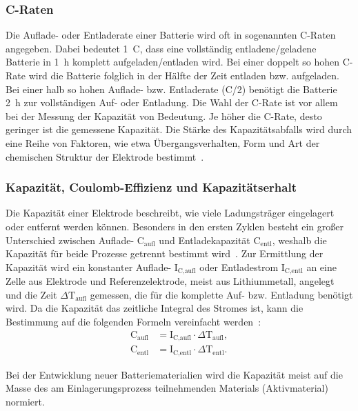 \subsubsection*{C-Raten}
Die Auflade- oder Entladerate einer Batterie wird oft in sogenannten C-Raten angegeben. Dabei bedeutet 1~C, dass eine vollständig entladene/geladene Batterie in 1~h komplett aufgeladen/entladen wird. Bei einer doppelt so hohen C-Rate wird die Batterie folglich in der Hälfte der Zeit entladen bzw. aufgeladen. Bei einer halb so hohen Auflade- bzw. Entladerate (C/2) benötigt die Batterie 2~h zur vollständigen Auf- oder Entladung. Die Wahl der C-Rate ist vor allem bei der Messung der Kapazität von Bedeutung. Je höher die C-Rate, desto geringer ist die gemessene Kapazität. Die Stärke des Kapazitätsabfalls wird durch eine Reihe von Faktoren, wie etwa Übergangsverhalten, Form und Art der chemischen Struktur der Elektrode bestimmt~\cite{Plett2015,Beard2019}.


\subsubsection*{Kapazität, Coulomb-Effizienz und Kapazitätserhalt}
Die Kapazität einer Elektrode beschreibt, wie viele Ladungsträger eingelagert oder entfernt werden können. Besonders in den ersten Zyklen besteht ein großer Unterschied zwischen Auflade- $\text{C}_{\text{aufl}}$ und Entladekapazität $\text{C}_{\text{entl}}$, weshalb die Kapazität für beide Prozesse getrennt bestimmt wird~\cite{Plett2015}.
Zur Ermittlung der Kapazität wird ein konstanter Auflade- $\text{I}_\text{C,aufl}$ oder Entladestrom $\text{I}_\text{C,entl}$ an eine Zelle aus Elektrode und Referenzelektrode, meist aus Lithiummetall, angelegt und die Zeit $\Delta \text{T}_\text{aufl}$ gemessen, die für die komplette Auf- bzw. Entladung benötigt wird. Da die Kapazität das zeitliche Integral des Stromes ist, kann die Bestimmung auf die folgenden Formeln vereinfacht werden~\cite{Newman2021}:
\begin{align}
	\text{C}_{\text{aufl}} &= \text{I}_\text{C,aufl} \cdot \Delta \text{T}_\text{aufl},\\
	\text{C}_{\text{entl}} &= \text{I}_\text{C,entl} \cdot \Delta \text{T}_\text{entl}.
\end{align}

Bei der Entwicklung neuer Batteriematerialien wird die Kapazität meist auf die Masse des am Einlagerungsprozess teilnehmenden Materials (Aktivmaterial) normiert. 

